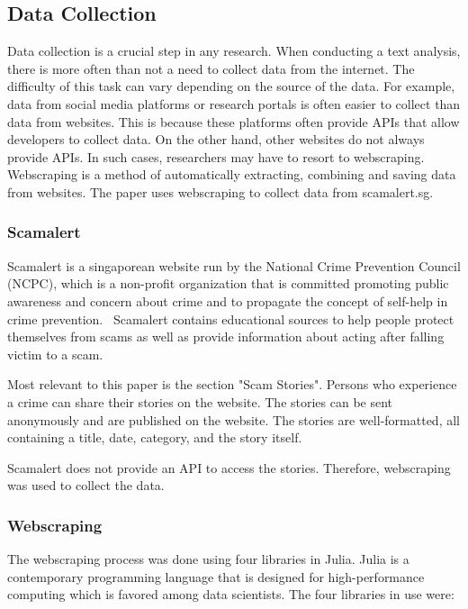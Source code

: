 \subsection{Data Collection}

Data collection is a crucial step in any research. When conducting a text analysis, there is more often than not a need to collect data from the internet. The difficulty of this task can vary depending on the source of the data. For example, data from social media platforms or research portals is often easier to collect than data from websites. This is because these platforms often provide APIs that allow developers to collect data. On the other hand, other websites do not always provide APIs. In such cases, researchers may have to resort to webscraping. Webscraping is a method of automatically extracting, combining and saving data from websites. The paper uses webscraping to collect data from scamalert.sg.

\subsubsection{Scamalert}

Scamalert is a singaporean website run by the National Crime Prevention Council (NCPC), which is a non-profit organization that is committed promoting public awareness and concern about crime and to propagate the concept of self-help in crime prevention.~\citep{ncpc} Scamalert contains educational sources to help people protect themselves from scams as well as provide information about acting after falling victim to a scam.

Most relevant to this paper is the section "Scam Stories". Persons who experience a crime can share their stories on the website. The stories can be sent anonymously and are published on the website. The stories are well-formatted, all containing a title, date, category, and the story itself.

Scamalert does not provide an API to access the stories. Therefore, webscraping was used to collect the data. 

\subsubsection{Webscraping}

The webscraping process was done using four libraries in Julia. Julia is a contemporary programming language that is designed for high-performance computing which is favored among data scientists. %
The four libraries in use were:

